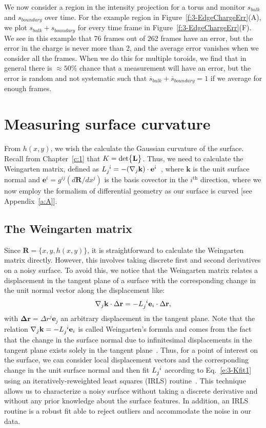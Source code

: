 We now consider a region in the intensity projection for a torus and monitor  $s_{bulk}$ and $s_{boundary}$ over time.
For the example region in Figure~\ref{f:3-EdgeChargeErr}(A), we plot $s_{bulk}+s_{boundary}$ for every time frame in Figure~\ref{f:3-EdgeChargeErr}(F).
We see in this example that 76 frames out of 262 frames have an error, but the error in the charge is never more than 2, and the average error vanishes when we consider all the frames.
When we do this for multiple toroids, we find that in general there is $\approx 50$\% chance that a measurement will have an error, but the error is random and not systematic such that $\overbar{s}_{bulk} + \overbar{s}_{boundary} = 1$ if we average for enough frames.




\section{Measuring surface curvature}
From $h(x,y)$, we wish the calculate the Gaussian curvature of the surface.
Recall from Chapter~\ref{c:1} that $K = \textup{det} \big \{ \mathbf{L} \big \}$.
Thus, we need to calculate the Weingarten matrix, defined as $\tensor{L}{_j^i} = -(\nabla_j \mathbf{k}) \cdot \mathbf{e}^i$~\cite{RN35}, where $\mathbf{k}$ is the unit surface normal and $\mathbf{e}^i = g^{ij}(d \mathbf{R}/dx^j)$ is the basis covector in the $i^{\textrm{th}}$ direction, where we now employ the formalism of differential geometry as our surface is curved [see Appendix~\ref{a:A}].


\subsection{The Weingarten matrix}
Since $\mathbf{R} = \{x, y, h(x,y)\}$, it is straightforward to calculate the Weingarten matrix directly.
However, this involves taking discrete first and second derivatives on a noisy surface.
To avoid this, we notice that the Weingarten matrix relates a displacement in the tangent plane of a surface with the corresponding change in the unit normal vector along the displacement like:
\begin{equation}
\nabla_j \mathbf{k} \cdot \Delta \mathbf{r} = -\tensor{L}{_j^i} \mathbf{e}_i \cdot \Delta \mathbf{r},\label{e:3-Kfit1}
\end{equation}
with $\mathbf{\Delta r} = \Delta r^j \mathbf{e}_j$ an arbitrary displacement in the tangent plane.
Note that the relation $\nabla_j \mathbf{k} = -\tensor{L}{_j^i} \mathbf{e}_i$ is called Weingarten's formula and comes from the fact that the change in the surface normal due to infinitesimal displacements in the tangent plane exists solely in the tangent plane~\cite{RN35}.
Thus, for a point of interest on the surface, we can consider local displacement vectors and the corresponding change in the unit surface normal and then fit $\tensor{L}{_j^i}$ according to Eq.~\ref{e:3-Kfit1} using an iteratively-reweighted least squares (IRLS) routine~\cite{RN32,RN31}.
This technique allows us to characterize a noisy surface without taking a discrete derivative and without any prior knowledge about the surface features.
In addition, an IRLS routine is a robust fit able to reject outliers and accommodate the noise in our data.


